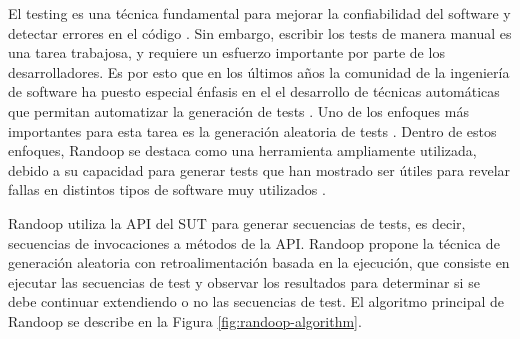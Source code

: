             
            
                
    

El testing es una técnica fundamental para mejorar la confiabilidad del software
y detectar errores en el código \cite{} . 
Sin embargo, escribir los tests de manera manual es una tarea trabajosa, y
requiere un esfuerzo importante por parte de los desarrolladores. Es por esto
que en los últimos años la comunidad de la ingeniería de software ha puesto especial énfasis en el
el desarrollo de técnicas automáticas que permitan automatizar la generación de
tests \cite{} . 
Uno de los enfoques más importantes para esta tarea es la generación aleatoria
de tests \cite{} . 
Dentro de estos enfoques, Randoop se destaca como una herramienta ampliamente
utilizada, debido a su capacidad para generar tests que han mostrado ser útiles para revelar
fallas en distintos tipos de software muy utilizados \cite{} 
.

Randoop utiliza la API del SUT para generar secuencias de tests, es decir,
secuencias de invocaciones a métodos de la API. Randoop propone la técnica
de generación aleatoria con retroalimentación basada en la ejecución, que
consiste en ejecutar las secuencias de test y observar los resultados para 
determinar si se debe continuar extendiendo o no las secuencias de test. 
El algoritmo principal de Randoop se describe en la Figura \ref{fig:randoop-algorithm}.

